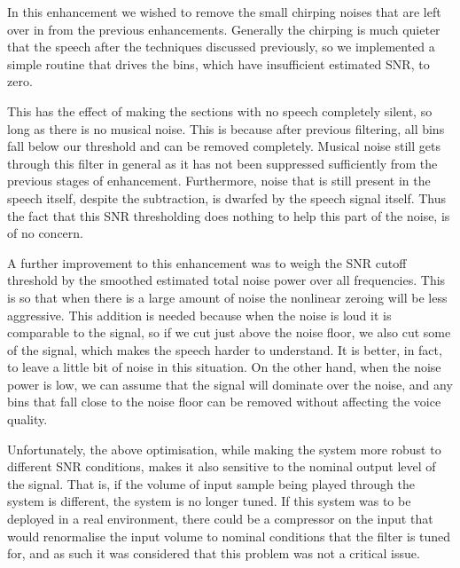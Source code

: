 \documentclass[11pt]{article} %
\begin{document}
{In this enhancement we wished to remove the small chirping noises that are left over in from the previous enhancements. Generally the chirping is much quieter that the speech after the techniques discussed previously, so we implemented a simple routine that drives the bins, which have insufficient estimated SNR, to zero.

This has the effect of making the sections with no speech completely silent, so long as there is no musical noise. This is because after previous filtering, all bins fall below our threshold and can be removed completely. Musical noise still gets through this filter in general as it has not been suppressed sufficiently from the previous stages of enhancement. Furthermore, noise that is still present in the speech itself, despite the subtraction, is dwarfed by the speech signal itself. Thus the fact that this SNR thresholding does nothing to help this part of the noise, is of no concern.

A further improvement to this enhancement was to weigh the SNR cutoff threshold by the smoothed estimated total noise power over all frequencies. This is so that  when there is a large amount of noise the nonlinear zeroing will be less aggressive.
This addition is needed because when the noise is loud it is comparable to the signal, so if we cut just above the noise floor, we also cut some of the signal, which makes the speech harder to understand. It is better, in fact, to leave a little bit of noise in this situation. On the other hand, when the noise power is low, we can assume that the signal will dominate over the noise, and any bins that fall close to the noise floor can be removed without affecting the voice quality.

Unfortunately, the above optimisation, while making the system more robust to different SNR conditions, makes it also sensitive to the nominal output level of the signal. That is, if the volume of input sample being played through the system is different, the system is no longer tuned. If this system was to be deployed in a real environment, there could be a compressor on the input that would renormalise the input volume to nominal conditions that the filter is tuned for, and as such it was considered that this problem was not a critical issue.

}
\end{document}
